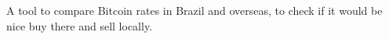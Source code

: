 A tool to compare Bitcoin rates in Brazil and overseas, to check if it would be nice buy there and sell locally. 